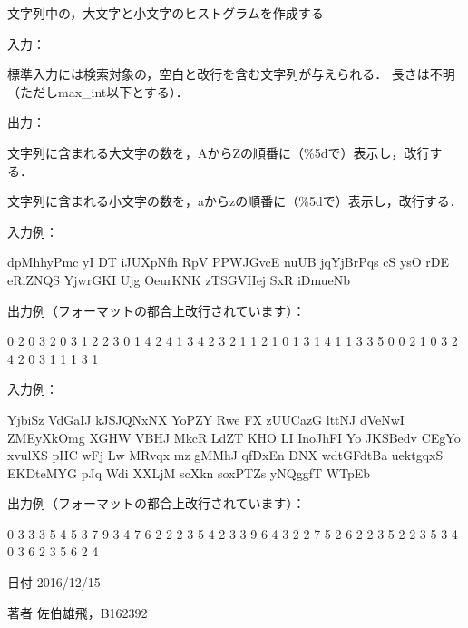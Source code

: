 文字列中の，大文字と小文字のヒストグラムを作成する 

入力：
\begin{DoxyItemize}
\item 標準入力には検索対象の，空白と改行を含む文字列が与えられる． 長さは不明（ただしmax\-\_\-int以下とする）．
\end{DoxyItemize}

出力：
\begin{DoxyItemize}
\item 文字列に含まれる大文字の数を，\-Aから\-Zの順番に（\%5dで）表示し，改行する．
\item 文字列に含まれる小文字の数を，aからzの順番に（\%5dで）表示し，改行する．
\end{DoxyItemize}

入力例： \begin{DoxyVerb}dpMhhyPmc yI DT iJUXpNfh RpV PPWJGvcE nuUB jqYjBrPqs
cS ysO rDE eRiZNQS YjwrGKI Ujg
OeurKNK zTSGVHej SxR iDmueNb
\end{DoxyVerb}
 出力例（フォーマットの都合上改行されています）： \begin{DoxyVerb}    0     2     0     3     2     0     3     1     2     2     3     0     1
4     2     4     1     3     4     2     3     2     1     1     2     1
    0     1     3     1     4     1     1     3     3     5     0     0     2
1     0     3     2     4     2     0     3     1     1     1     3     1
\end{DoxyVerb}
 入力例： \begin{DoxyVerb}YjbiSz VdGaIJ
kJSJQNxNX YoPZY Rwe
FX zUUCazG lttNJ dVeNwI ZMEyXkOmg XGHW VBHJ
MkcR LdZT KHO LI InoJhFI
Yo JKSBedv CEgYo xvulXS pIIC wFj Lw
MRvqx mz gMMhJ
qfDxEn DNX wdtGFdtBa uektgqxS EKDteMYG pJq
Wdi XXLjM scXkn soxPTZs yNQggfT WTpEb
\end{DoxyVerb}
 出力例（フォーマットの都合上改行されています）： \begin{DoxyVerb}    0     3     3     3     5     4     5     3     7     9     3     4     7
6     2     2     2     3     5     4     2     3     3     9     6     4
    3     2     2     7     5     2     6     2     2     3     5     2     2
3     5     3     4     0     3     6     2     3     5     6     2     4
\end{DoxyVerb}
 \begin{DoxyDate}{日付}
2016/12/15 
\end{DoxyDate}
\begin{DoxyAuthor}{著者}
佐伯雄飛，\-B162392 
\end{DoxyAuthor}


